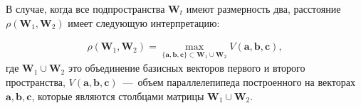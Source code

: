 В случае, когда все подпространства $\textbf{W}_t$ имеют размерность два, расстояние $\rho\left(\textbf{W}_1, \textbf{W}_2\right)$ имеет следующую интерпретацию:

\[
\label{eq:cl:5}
\begin{aligned}
\rho\left(\textbf{W}_1, \textbf{W}_2\right) = \max_{\{\textbf{a},\textbf{b},\textbf{c}\} \subset \textbf{W}_1\cup \textbf{W}_2 } V\left(\textbf{a},\textbf{b},\textbf{c}\right), 
\end{aligned}
\]
где $\textbf{W}_1\cup\textbf{W}_2$ это объединение базисных векторов первого и второго пространства, $V\left(\textbf{a},\textbf{b},\textbf{c}\right)$~---~объем параллелепипеда построенного на векторах $\textbf{a}, \textbf{b}, \textbf{c}$, которые являются столбцами матрицы $\textbf{W}_1\cup\textbf{W}_2$.


